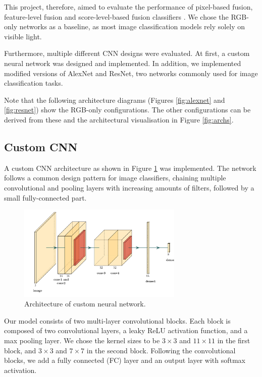 \documentclass{l4proj}
\begin{document}
This project, therefore, aimed to evaluate the performance of pixel-based fusion, feature-level fusion and score-level-based fusion classifiers \citep{guo_face_2017}. We chose the RGB-only networks as a baseline, as most image classification models rely solely on visible light.

Furthermore, multiple different CNN designs were evaluated. At first, a custom neural network was designed and implemented. In addition, we implemented modified versions of AlexNet and ResNet, two networks commonly used for image classification tasks. 

Note that the following architecture diagrams (Figures \ref{fig:alexnet} and \ref{fig:resnet}) show the RGB-only configurations. The other configurations can be derived from these and the architectural visualisation in Figure \ref{fig:archs}.

\subsection{Custom CNN}

A custom CNN architecture as shown in Figure \ref{fig:customnet} was implemented. The network follows a common design pattern for image classifiers, chaining multiple convolutional and pooling layers with increasing amounts of filters, followed by a small fully-connected part. 


\begin{figure}[ht]
  \centering
  \includegraphics[width=0.7\textwidth]{images/models/customnet}
  \caption{Architecture of custom neural network.}
  \label{fig:customnet}
\end{figure}

Our model consists of two multi-layer convolutional blocks. Each block is composed of two convolutional layers, a leaky ReLU activation function, and a max pooling layer. We chose the kernel sizes to be $3 \times 3$ and $11 \times 11$ in the first block, and $3 \times 3$ and $7 \times 7$ in the second block. Following the convolutional blocks, we add a fully connected (FC) layer and an output layer with softmax activation. 
\end{document}
